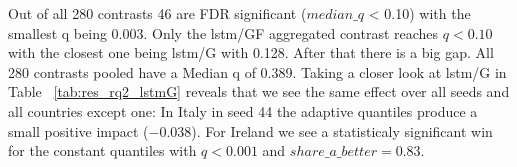 Out of all 280 contrasts 46 are FDR significant ($median\_q$ < 0.10) with the smallest q being 0.003. Only the lstm/GF aggregated contrast reaches $q<0.10$ with the closest one being lstm/G
with 0.128. After that there is a big gap. All 280 contrasts pooled have a Median q of 0.389.
Taking a closer look at lstm/G in Table ~\ref{tab:res_rq2_lstmG} reveals that we see the same effect over all seeds and all countries except one: In Italy in seed 44 the adaptive quantiles produce a small positive impact (−0.038). For Ireland we see a statisticaly significant win for the constant quantiles with $q<0.001$ and $share\_a\_better=0.83$.
